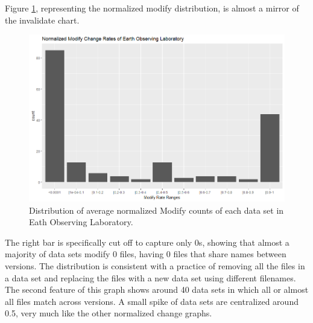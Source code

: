 Figure \ref{EOL_Mods}, representing the normalized \gls{modify} distribution, is almost a mirror of the \gls{invalidate} chart.
\begin{figure}%
	\centering
	\includegraphics[scale=.6]{figures/Eol_Mod.png}
	\caption{Distribution of average normalized Modify counts of each data set in Eath Observing Laboratory.}
	\label{EOL_Mods}
\end{figure}
The right bar is specifically cut off to capture only 0s, showing that almost a majority of data sets modify 0 files, having 0 files that share names between \glspl{version}.
The distribution is consistent with a practice of removing all the files in a data set and replacing the files with a new data set using different filenames.
The second feature of this graph shows around 40 data sets in which all or almost all files match across \glspl{version}.
A small spike of data sets are centralized around 0.5, very much like the other normalized change graphs.

